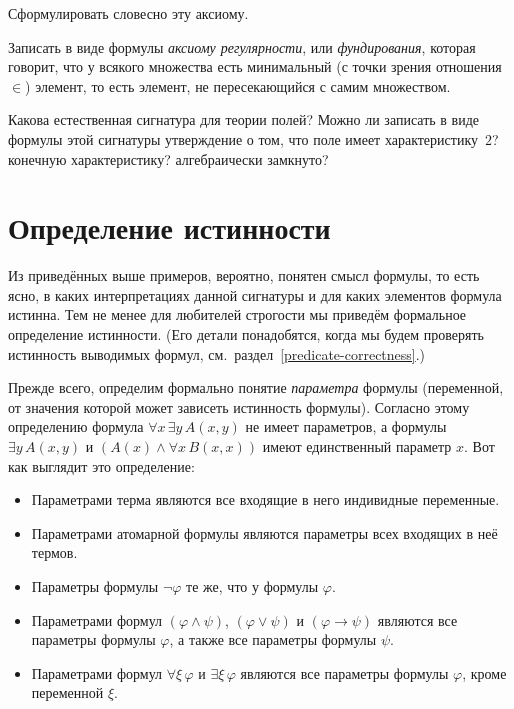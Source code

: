 \begin{problem}
Сформулировать словесно эту аксиому.
\end{problem}

\begin{problem}
Записать в виде формулы \emph{аксиому регулярности}, или \emph{фундирования},%
которая говорит, что у всякого множества есть минимальный (с точки зрения
отношения $\in$) элемент, то есть элемент, не пересекающийся с самим
множеством.
\end{problem}

\begin{problem}
Какова естественная сигнатура для теории полей? Можно ли
записать в виде формулы этой сигнатуры утверждение о том, что
поле имеет характеристику~$2$? конечную характеристику?
алгебраически замкнуто?
\end{problem}

\section{Определение истинности}
        \label{truth-definition}%
Из приведённых выше примеров, вероятно, понятен смысл формулы,
то есть ясно, в каких интерпретациях данной сигнатуры и для
каких элементов формула истинна. Тем не менее для любителей
строгости мы приведём формальное определение истинности. (Его
детали понадобятся, когда мы будем проверять истинность
выводимых формул, см.~раздел~\ref{predicate-correctness}.)

Прежде всего, определим формально понятие \emph{параметра}%
%
формулы (переменной, от значения которой может зависеть
истинность формулы). Согласно этому определению формула
        $
\forall x\,\exists y\, A(x,y)
        $
не имеет параметров, а формулы
        $
 \exists y\, A(x,y)
        $
и
        $
(A(x)\land \forall x\, B(x,x))
        $
имеют единственный параметр $x$. Вот как выглядит это
определение:
\begin{itemize}
        \item
Параметрами терма являются все входящие в него
индивидные переменные.
        \item
Параметрами атомарной формулы являются параметры всех
входящих в неё термов.
        \item
Параметры формулы $\lnot \varphi$ те же, что у формулы
$\varphi$.
        \item
Параметрами формул $(\varphi\land\psi)$, $(\varphi\lor\psi)$ и
$(\varphi\to\psi)$ являются все параметры формулы $\varphi$, а
также все параметры формулы $\psi$.
        \item
Параметрами формул $\forall\xi\,\varphi$ и $\exists\xi\,\varphi$
являются все параметры формулы $\varphi$, кроме переменной $\xi$.
\end{itemize}

